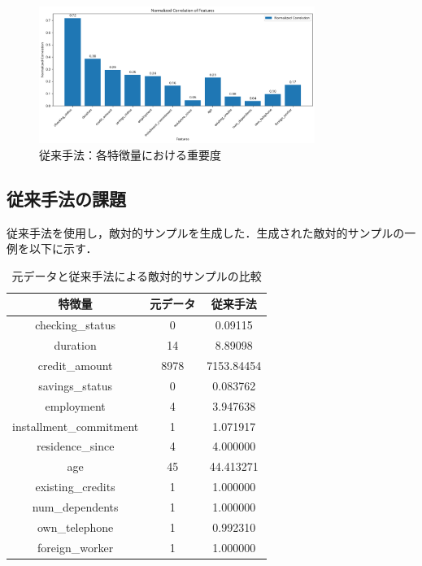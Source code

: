 \begin{figure}[H]
    \centering
    \includegraphics[width=0.8\textwidth]{images/従来手法_特徴量重要度.png}
    \caption{従来手法：各特徴量における重要度}
    \label{fig:default_method_feature_importance}
\end{figure}


\subsection{従来手法の課題}
従来手法を使用し，敵対的サンプルを生成した．生成された敵対的サンプルの一例を以下に示す．
\begin{table}[H]
    \centering
    \caption{元データと従来手法による敵対的サンプルの比較}
    \begin{tabular}{|c|c|c|} \hline
        特徴量 & 元データ & 従来手法  \\ \hline
        checking\_status & 0 & 0.09115 \\ \hline
        duration & 14 & 8.89098  \\ \hline
        credit\_amount & 8978 & 7153.84454 \\ \hline
        savings\_status & 0 & 0.083762\\ \hline
        employment & 4 & 3.947638 \\ \hline
        installment\_commitment & 1 & 1.071917 \\ \hline
        residence\_since & 4 & 4.000000  \\ \hline
        age & 45 & 44.413271 \\ \hline
        existing\_credits & 1 & 1.000000 \\ \hline
        num\_dependents & 1 & 1.000000 \\ \hline
        own\_telephone & 1 & 0.992310 \\ \hline
        foreign\_worker & 1 & 1.000000 \\ \hline
    \end{tabular}
\end{table}

